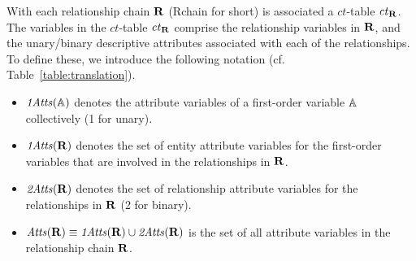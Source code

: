 \documentclass{sig-alternate-2013}
\newcommand{\ct}{\mathit{ct}}
\begin{document}
%
With each relationship chain $\mathbf{R}$ (Rchain for short) is associated a $\ct$-table $\ct_{\set{\Relation}}$. 
The variables in the $\ct$-table  $\ct_{\set{\Relation}}$ %
 comprise the relationship variables  in $\mathbf{R}$, and the unary/binary descriptive attributes associated with each of the relationships. To define these, we introduce the following notation (cf. Table~\ref{table:translation}).

\begin{itemize}
\item  $\it{1Atts}(\mathbb{A})$ denotes the attribute variables of a first-order variable $\mathbb{A}$ collectively (1 for unary).
\item $\it{1Atts}(\mathbf{R})$ denotes the set of entity attribute variables for the first-order variables that are involved in the relationships in $\mathbf{R}$. 
\item $\it{2Atts}(\mathbf{R})$ denotes the set of relationship attribute variables for %
the relationships in $\mathbf{R}$ (2 for binary).
\item $\it{Atts}(\mathbf{R}) \equiv \it{1Atts}(\mathbf{R}) \cup \it{2Atts}(\mathbf{R})$ is the set of all attribute variables in the relationship chain $\mathbf{R}$.

\end{itemize}
\end{document}
